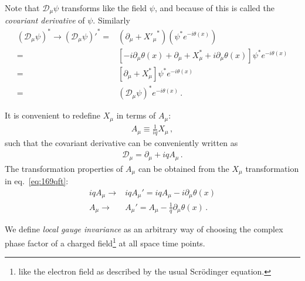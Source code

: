 Note that $\mathcal{D}_\mu\psi$ transforms like the field $\psi$, and because of this is called the \emph{covariant derivative} of $\psi$.
Similarly
\begin{align}
    (\mathcal{D}_\mu \psi)^*\to{\left(\mathcal{D}_\mu \psi\right)'}^*=&(\partial_\mu+{X'_\mu}^*) \left(\psi^*e^{-i\theta(x)}\right)\nonumber\\
=&\left[-i\partial_\mu \theta(x)+\partial_\mu+X_\mu^*+i\partial_\mu\theta(x) \right]\psi^*e^{-i\theta(x)}\nonumber\\
=&\left[\partial_\mu+X_\mu^*\right]\psi^*e^{-i\theta(x)}\nonumber\\
=&\left(\mathcal{D}_\mu\psi\right)^*e^{-i\theta(x)}\,.
\end{align}

It is convenient to redefine $X_\mu$ in terms of $A_\mu$:
\begin{align}
  A_\mu\equiv\frac{1}{i q}X_\mu\,,
\end{align}
such that the covariant derivative can be conveniently written as
\begin{align}
\label{eq:170qft}
  \mathcal{D}_\mu=\partial_\mu+i q A_\mu\,.
\end{align}
The transformation properties of $A_\mu$ can be obtained from the $X_\mu$ transformation in eq.~\eqref{eq:169qft}: 
\begin{align}
\label{eq:159qft}
 i q A_\mu\to& i q A_\mu'=i q A_\mu-i \partial_\mu\theta(x)\nonumber\\
  A_\mu\to&  A_\mu'= A_\mu-\frac{1}{q} \partial_\mu\theta(x)\,.
\end{align}


We define \emph{local gauge invariance} as an arbitrary way of choosing the complex phase factor of a charged field\footnote{like the electron field as described by the usual Scrödinger equation.} at all space time points.


